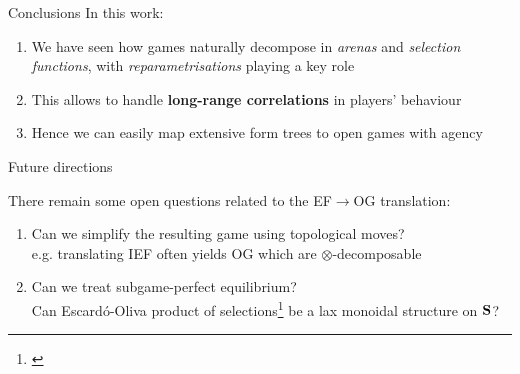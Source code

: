 \begin{frame}{Conclusions}
	In this work:
	\begin{enumerate}
		\item We have seen how games naturally decompose in \textcolor{colorarena}{\emph{arenas}} and \textcolor{coloragents}{\emph{selection functions}}, with \textcolor{coloragents}{\emph{reparametrisations}} playing a key role
		\item This allows to handle \textbf{long-range correlations} in players' behaviour
		\item Hence we can easily map extensive form trees to open games with agency
	\end{enumerate}
\end{frame}

\begin{frame}{Future directions}

	There remain some open questions related to the EF$\to$OG translation:
	\begin{enumerate}
		\item Can we simplify the resulting game using topological moves?\\
		\textcolor{colornote}{e.g. translating IEF often yields OG which are $\otimes$-decomposable}
		\item Can we treat subgame-perfect equilibrium?\\
		\textcolor{colornote}{Can Escard\'o-Oliva product of selections\footnote[frame]{\cite{escardo2015bar}} be a lax monoidal structure on $\S$?}
	\end{enumerate}

	\vfill
\end{frame}
